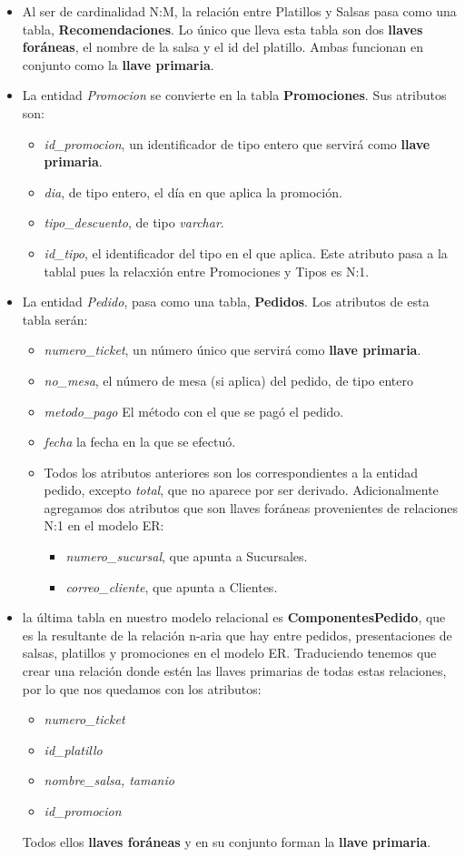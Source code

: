 \documentclass[11pt]{article}
\begin{document}
\begin{itemize}
\item Al ser de cardinalidad N:M, la relación entre Platillos y Salsas pasa como una tabla, \textbf{Recomendaciones}. Lo único que lleva esta tabla son dos \textbf{llaves foráneas}, el nombre de la salsa y el id del platillo. Ambas funcionan en conjunto como la \textbf{llave primaria}.
\item La entidad \textit{Promocion} se convierte en la tabla \textbf{Promociones}. Sus atributos son:
\begin{itemize}
\item \textit{id\_promocion}, un identificador de tipo entero que servirá como \textbf{llave primaria}.
\item \textit{dia}, de tipo entero, el día en que aplica la promoción.
\item \textit{tipo\_descuento}, de tipo \textit{varchar}.
\item \textit{id\_tipo}, el identificador del tipo en el que aplica. Este atributo pasa a la tablal pues la relacxión entre Promociones y Tipos es N:1.
\end{itemize}
\item La entidad \textit{Pedido}, pasa como una tabla, \textbf{Pedidos}. Los atributos de esta tabla serán:
\begin{itemize}
\item \textit{numero\_ticket}, un número único que servirá como \textbf{llave primaria}.
\item \textit{no\_mesa}, el número de mesa (si aplica) del pedido, de tipo entero
\item \textit{metodo\_pago} El método con el que se pagó el pedido.
\item \textit{fecha} la fecha en la que se efectuó. 
\item Todos los atributos anteriores son los correspondientes a la entidad pedido, excepto \textit{total}, que no aparece por ser derivado. Adicionalmente agregamos dos atributos que son llaves foráneas provenientes de relaciones N:1 en el modelo ER:
\begin{itemize}
\item \textit{numero\_sucursal}, que apunta a Sucursales.
\item \textit{correo\_cliente}, que apunta a Clientes.
\end{itemize}
\end{itemize}
\item la última tabla en nuestro modelo relacional es \textbf{ComponentesPedido}, que es la resultante de la relación n-aria que hay entre pedidos, presentaciones de salsas, platillos y promociones en el modelo ER. Traduciendo tenemos que crear una relación donde estén las llaves primarias de todas estas relaciones, por lo que nos quedamos con los atributos:
\begin{itemize}
\item \textit{numero\_ticket}
\item \textit{id\_platillo}
\item \textit{nombre\_salsa, tamanio}
\item \textit{id\_promocion}
\end{itemize}
Todos ellos \textbf{llaves foráneas} y en su conjunto forman la \textbf{llave primaria}.
\end{itemize}
\end{document}
